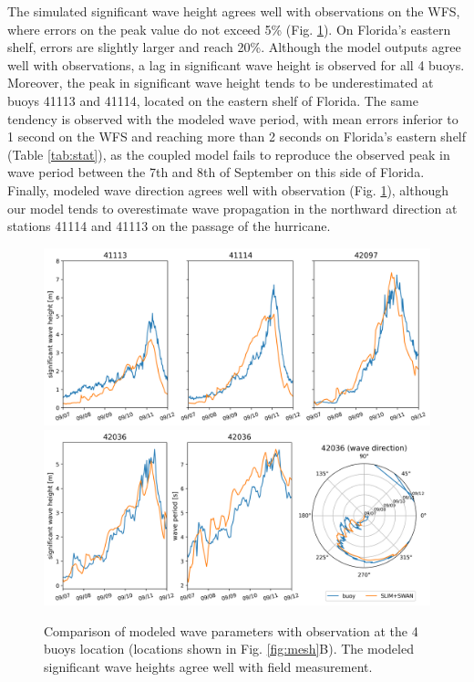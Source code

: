 \documentclass[preprint,12pt,authoryear]{elsarticle}
\begin{document}
The simulated significant wave height agrees well with observations on the WFS, where errors on the peak value do not exceed 5\% (Fig. \ref{fig:waves}). On Florida's eastern shelf, errors are slightly larger and reach 20\%. Although the model outputs agree well with observations, a lag in significant wave height is observed for all 4 buoys. Moreover, the peak in significant wave height tends to be underestimated at buoys 41113 and 41114, located on the eastern shelf of Florida. The same tendency is observed with the modeled wave period, with mean errors inferior to 1 second on the WFS and reaching more than 2 seconds on Florida's eastern shelf (Table \ref{tab:stat}), as the coupled model fails to reproduce the observed peak in wave period between the 7th and 8th of September on this side of Florida. Finally, modeled wave direction agrees well with observation (Fig. \ref{fig:waves}), although our model tends to overestimate wave propagation in the northward direction at stations 41114 and 41113 on the passage of the hurricane.

\begin{figure}
    \centering
    \includegraphics[width=\textwidth]{fig/hsig_with_map_ww3.png}
    \includegraphics[width=\textwidth]{fig/waves_ww3_5km-00002.png}
    \caption{Comparison of modeled wave parameters with observation at the 4 buoys location (locations shown in Fig. \ref{fig:mesh}B). The modeled significant wave heights agree well with field measurement. }
    \label{fig:waves}
\end{figure}
\end{document}
